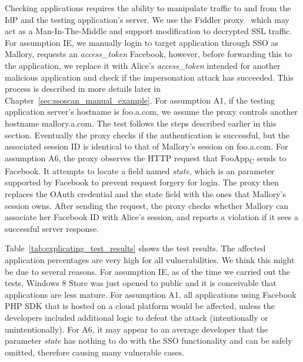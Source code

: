   Checking applications requires the ability to manipulate traffic to and from the IdP and the testing application's server.  We use the Fiddler proxy~\cite{Fiddler} which may act as a Man-In-The-Middle and support modification to decrypted SSL traffic.  For assumption IE, we manually login to target application through SSO as Mallory, requests an \emph{access\_token} Facebook, however, before forwarding this to the application, we replace it with Alice's \emph{access\_token} intended for another malicious application and check if the impersonation attack has succeeded.  This process is described in more details later in Chapter~\ref{sec:ssoscan_manual_example}.  For assumption A1, if the testing application server's hostname is foo.a.com, we assume the proxy controls another hostname mallory.a.com.  The test follows the steps described earlier in this section.  Eventually the proxy checks if the authentication is successful, but the associated session ID is identical to that of Mallory’s session on foo.a.com.  For assumption A6, the proxy observes the HTTP request that FooApp\textsubscript{C} sends to Facebook.  It attempts to locate a field named \emph{state}, which is an parameter supported by Facebook to prevent request forgery for login.  The proxy then replaces the OAuth credential and the state field with the ones that Mallory's session owns.  After sending the request, the proxy checks whether Mallory can associate her Facebook ID with Alice's session, and reports a violation if it sees a successful server response.  



 Table~\ref{tab:explicating_test_results} shows the test results.  The affected application percentages are very high for all vulnerabilities.  We think this might be due to several reasons.  For assumption IE, as of the time we carried out the tests, Windows 8 Store was just opened to public and it is conceivable that applications are less mature.  For assumption A1, all applications using Facebook PHP SDK that is hosted on a cloud platform would be affected, unless the developers included additional logic to defeat the attack (intentionally or unintentionally).  For A6, it may appear to an average developer that the parameter \emph{state} has nothing to do with the SSO functionality and can be safely omitted, therefore causing many vulnerable cases.